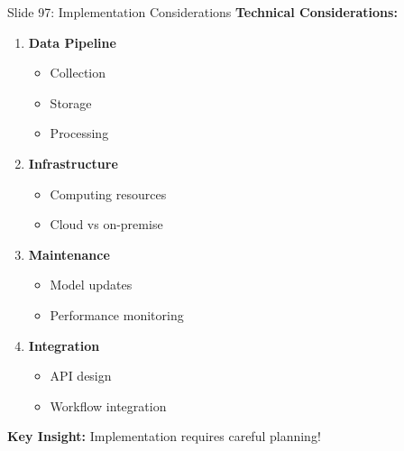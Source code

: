 \documentclass[8pt]{beamer}
\begin{document}
	\begin{frame}{Slide 97: Implementation Considerations}
		\fontsize{6.5}{7.5}\selectfont
		\textbf{Technical Considerations:}
		\begin{enumerate}
			\item \textbf{Data Pipeline}
			\begin{itemize}
				\item Collection
				\item Storage
				\item Processing
			\end{itemize}
			\item \textbf{Infrastructure}
			\begin{itemize}
				\item Computing resources
				\item Cloud vs on-premise
			\end{itemize}
			\item \textbf{Maintenance}
			\begin{itemize}
				\item Model updates
				\item Performance monitoring
			\end{itemize}
			\item \textbf{Integration}
			\begin{itemize}
				\item API design
				\item Workflow integration
			\end{itemize}
		\end{enumerate}
		
		\textcolor{myblue}{\textbf{Key Insight:}} Implementation requires careful planning!
	\end{frame}
	
\end{document}
